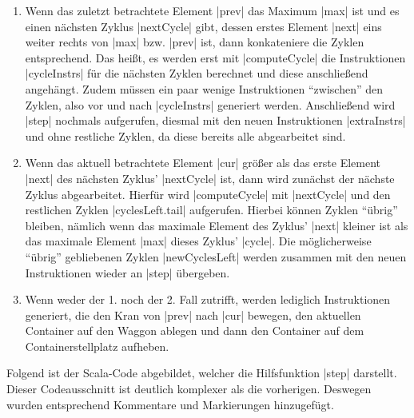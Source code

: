 \begin{enumerate}
 \item Wenn das zuletzt betrachtete Element |prev| das Maximum |max| ist und es einen nächsten Zyklus |nextCycle| gibt,
       dessen erstes Element |next| eins weiter rechts von |max| bzw. |prev| ist, dann konkateniere die Zyklen entsprechend.
       Das heißt, es werden erst mit |computeCycle| die Instruktionen |cycleInstrs| für die nächsten Zyklen berechnet
       und diese anschließend angehängt. Zudem müssen ein paar wenige Instruktionen ``zwischen'' den Zyklen,
       also vor und nach |cycleInstrs| generiert werden. Anschließend wird |step| nochmals aufgerufen,
       diesmal mit den neuen Instruktionen |extraInstrs| und ohne restliche Zyklen, da diese bereits alle abgearbeitet sind.
 \item Wenn das aktuell betrachtete Element |cur| größer als das erste Element |next| des nächsten Zyklus' |nextCycle| ist,
       dann wird zunächst der nächste Zyklus abgearbeitet.
       Hierfür wird |computeCycle| mit |nextCycle| und den restlichen Zyklen |cyclesLeft.tail| aufgerufen.
       Hierbei können Zyklen ``übrig'' bleiben,
       nämlich wenn das maximale Element des Zyklus' |next| kleiner ist als das maximale Element |max| dieses Zyklus' |cycle|.
       Die möglicherweise ``übrig'' gebliebenen Zyklen |newCyclesLeft| werden zusammen mit den neuen Instruktionen wieder an |step| übergeben.
 \item Wenn weder der 1. noch der 2. Fall zutrifft, werden lediglich Instruktionen generiert,
       die den Kran von |prev| nach |cur| bewegen, den aktuellen Container auf den Waggon ablegen und dann den Container auf dem Containerstellplatz aufheben.
\end{enumerate}
Folgend ist der Scala-Code abgebildet, welcher die Hilfsfunktion |step| darstellt.
Dieser Codeausschnitt ist deutlich komplexer als die vorherigen. Deswegen wurden entsprechend Kommentare und Markierungen hinzugefügt.
\lstset{basicstyle=\ttfamily}
